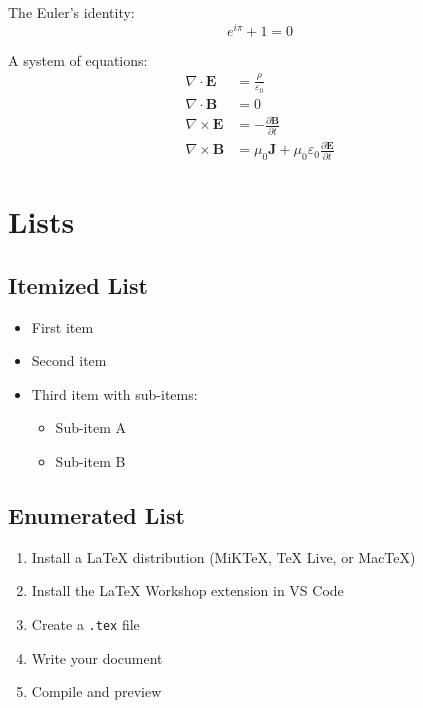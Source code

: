 \documentclass[12pt,a4paper]{article}
\begin{document}
The Euler's identity:
\begin{equation}
    e^{i\pi} + 1 = 0
    \label{eq:euler}
\end{equation}

A system of equations:
\begin{align}
    \nabla \cdot \mathbf{E} &= \frac{\rho}{\varepsilon_0} \\
    \nabla \cdot \mathbf{B} &= 0 \\
    \nabla \times \mathbf{E} &= -\frac{\partial \mathbf{B}}{\partial t} \\
    \nabla \times \mathbf{B} &= \mu_0 \mathbf{J} + \mu_0 \varepsilon_0 \frac{\partial \mathbf{E}}{\partial t}
\end{align}

\section{Lists}

\subsection{Itemized List}

\begin{itemize}
    \item First item
    \item Second item
    \item Third item with sub-items:
    \begin{itemize}
        \item Sub-item A
        \item Sub-item B
    \end{itemize}
\end{itemize}

\subsection{Enumerated List}

\begin{enumerate}
    \item Install a \LaTeX{} distribution (MiKTeX, TeX Live, or MacTeX)
    \item Install the LaTeX Workshop extension in VS Code
    \item Create a \texttt{.tex} file
    \item Write your document
    \item Compile and preview
\end{enumerate}
\end{document}
